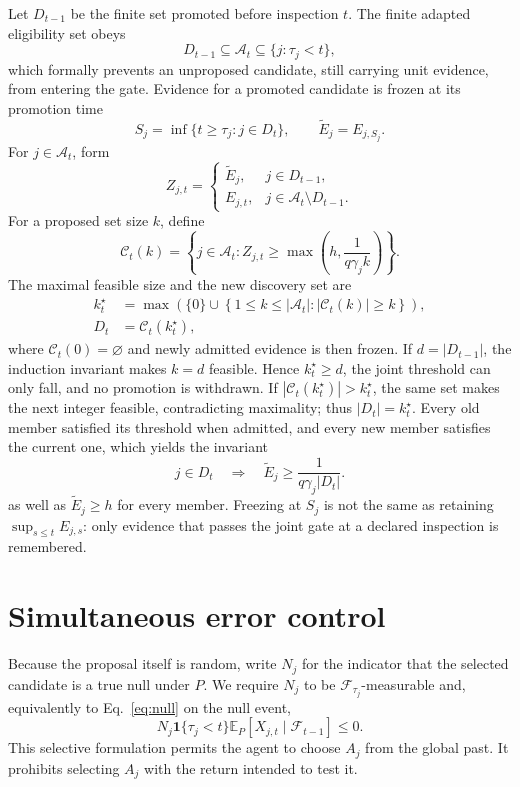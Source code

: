 Let \(D_{t-1}\) be the finite set promoted before inspection \(t\).  The
finite adapted eligibility set obeys
\begin{equation}
D_{t-1}\subseteq\mathcal A_t\subseteq\{j:\tau_j<t\},
\label{eq:eligibility}
\end{equation}
which formally prevents an unproposed candidate, still carrying unit
evidence, from entering the gate.  Evidence for a promoted candidate is
frozen at its promotion time
\[
S_j=\inf\{t\ge\tau_j:j\in D_t\},\qquad
\widetilde E_j=E_{j,S_j}.
\]
For \(j\in\mathcal A_t\), form
\[
Z_{j,t}=
\begin{cases}
\widetilde E_j,&j\in D_{t-1},\\
E_{j,t},&j\in\mathcal A_t\setminus D_{t-1}.
\end{cases}
\]
For a proposed set size \(k\), define
\[
\mathcal C_t(k)=\left\{j\in\mathcal A_t:
Z_{j,t}\ge\max\!\left(h,\frac{1}{q\gamma_jk}\right)\right\}.
\]
The maximal feasible size and the new discovery set are
\begin{align}
k_t^\star
&=\max\!\left(\{0\}\cup
\left\{1\le k\le|\mathcal A_t|:|\mathcal C_t(k)|\ge k\right\}\right),
\label{eq:stepup}\\
D_t&=\mathcal C_t(k_t^\star),
\label{eq:discoveries}
\end{align}
where \(\mathcal C_t(0)=\varnothing\) and newly admitted evidence is then
frozen.  If \(d=|D_{t-1}|\), the induction invariant makes \(k=d\) feasible.
Hence
\(k_t^\star\ge d\), the joint threshold can only fall, and no promotion is
withdrawn.  If \(|\mathcal C_t(k_t^\star)|>k_t^\star\), the same set makes the
next integer feasible, contradicting maximality; thus
\(|D_t|=k_t^\star\).  Every old member satisfied its threshold when admitted,
and every new member satisfies the current one, which yields the invariant
\begin{equation}
j\in D_t\quad\Longrightarrow\quad
\widetilde E_j\ge\frac{1}{q\gamma_j|D_t|}.
\label{eq:selfconsistent}
\end{equation}
as well as \(\widetilde E_j\ge h\) for every member.  Freezing at \(S_j\) is
not the same as retaining \(\sup_{s\le t}E_{j,s}\): only evidence that passes
the joint gate at a declared inspection is remembered.

\section{Simultaneous error control}
\label{sec:theory}

Because the proposal itself is random, write \(N_j\) for the indicator that
the selected candidate is a true null under \(P\).  We require \(N_j\) to be
\(\mathcal F_{\tau_j}\)-measurable and, equivalently to
Eq.~\eqref{eq:null} on the null event,
\[
N_j\mathbf1\{\tau_j<t\}
\mathbb E_P[X_{j,t}\mid\mathcal F_{t-1}]\le0.
\]
This selective formulation permits the agent to choose \(A_j\) from the
global past.  It prohibits selecting \(A_j\) with the return intended to test
it.

